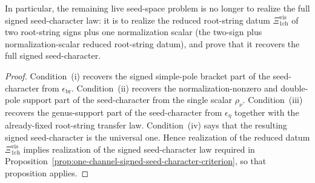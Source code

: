 \begin{proposition}
In particular, the remaining live seed-space problem is no longer to
realize the full signed seed-character law: it is to realize the
reduced root-string datum
$\Xi_{\mathrm{1ch}}^{\mathrm{vis}}$
of two root-string signs plus one normalization scalar (the
two-sign plus normalization-scalar reduced root-string datum), and
prove that it recovers the full signed seed-character.
\end{proposition}

\begin{proof}
Condition~\textup{(i)} recovers the signed simple-pole bracket part of
the seed-character from $\epsilon_{\mathrm{br}}$.
Condition~\textup{(ii)} recovers the normalization-nonzero and
double-pole support part of the seed-character from the single scalar
$\rho_{\nu}$.
Condition~\textup{(iii)} recovers the genus-support part of the
seed-character from $\epsilon_{\eta}$ together with the already-fixed
root-string transfer law.
Condition~\textup{(iv)} says that the resulting signed seed-character is
the universal one.  Hence realization of the reduced datum
$\Xi_{\mathrm{1ch}}^{\mathrm{vis}}$
implies realization of the signed seed-character law required in
Proposition~\ref{prop:one-channel-signed-seed-character-criterion},
so that proposition applies.
\end{proof}

